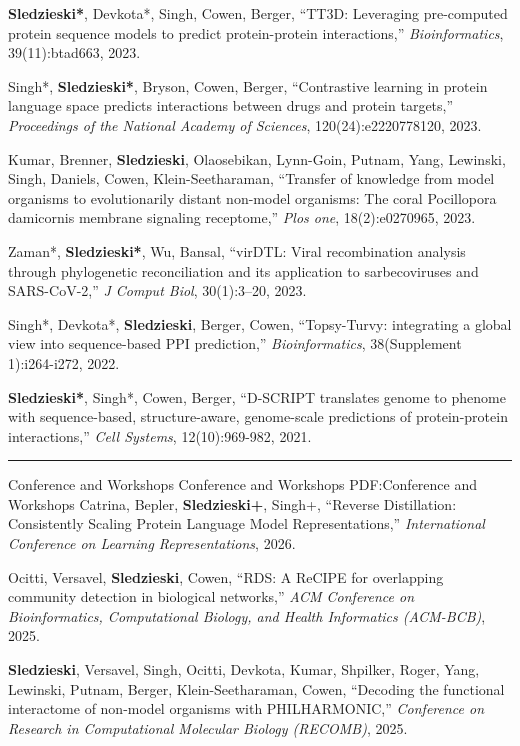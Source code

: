 \documentclass[letterpaper,MMMyyyy,nonstopmode]{simpleresumecv}
\begin{document}
\begin{Body}
\Gap
\NumberedItem{[6]}
{{\textbf{Sledzieski*}, Devkota*, Singh, Cowen, Berger}, 
``TT3D: Leveraging pre-computed protein sequence models to predict protein-protein interactions,'' 
\textit{Bioinformatics}, 39(11):btad663, 2023.
}

\Gap
\NumberedItem{[5]}
{{Singh*, \textbf{Sledzieski*}, Bryson, Cowen, Berger}, 
``Contrastive learning in protein language space predicts interactions between drugs and protein targets,'' 
\textit{Proceedings of the National Academy of Sciences}, 120(24):e2220778120, 2023.
}

\Gap
\NumberedItem{[4]}
{{Kumar, Brenner, \textbf{Sledzieski}, Olaosebikan, Lynn-Goin, Putnam, Yang, Lewinski, Singh, Daniels, Cowen, Klein-Seetharaman}, 
``Transfer of knowledge from model organisms to evolutionarily distant non-model organisms: The coral Pocillopora damicornis membrane signaling receptome,'' 
\textit{Plos one}, 18(2):e0270965, 2023.
}

\Gap
\NumberedItem{[3]}
{{Zaman*, \textbf{Sledzieski*}, Wu, Bansal}, 
``virDTL: Viral recombination analysis through phylogenetic reconciliation and its application to sarbecoviruses and SARS-CoV-2,'' 
\textit{J Comput Biol}, 30(1):3--20, 2023.
}

\Gap
\NumberedItem{[2]}
{{Singh*, Devkota*, \textbf{Sledzieski}, Berger, Cowen}, 
``Topsy-Turvy: integrating a global view into sequence-based PPI prediction,'' 
\textit{Bioinformatics}, 38(Supplement 1):i264-i272, 2022.
}

\Gap
\NumberedItem{[1]}
{{\textbf{Sledzieski*}, Singh*, Cowen, Berger}, 
``D-SCRIPT translates genome to phenome with sequence-based, structure-aware, genome-scale predictions of protein-protein interactions,'' 
\textit{Cell Systems}, 12(10):969-982, 2021.
}


\BigGap
\hrule
\Section
{Conference and Workshops}
{Conference and Workshops}
{PDF:Conference and Workshops}
\Gap
\NumberedItem{[8]}
{{Catrina, Bepler, \textbf{Sledzieski+}, Singh+}, 
``Reverse Distillation: Consistently Scaling Protein Language Model Representations,'' 
\textit{International Conference on Learning Representations}, 2026.
}

\Gap
\NumberedItem{[7]}
{{Ocitti, Versavel, \textbf{Sledzieski}, Cowen}, 
``RDS: A ReCIPE for overlapping community detection in biological networks,'' 
\textit{ACM Conference on Bioinformatics, Computational Biology, and Health Informatics (ACM-BCB)}, 2025.
}

\Gap
\NumberedItem{[6]}
{{\textbf{Sledzieski}, Versavel, Singh, Ocitti, Devkota, Kumar, Shpilker, Roger, Yang, Lewinski, Putnam, Berger, Klein-Seetharaman, Cowen}, 
``Decoding the functional interactome of non-model organisms with PHILHARMONIC,'' 
\textit{Conference on Research in Computational Molecular Biology (RECOMB)}, 2025.
}


\end{Body}
\end{document}
